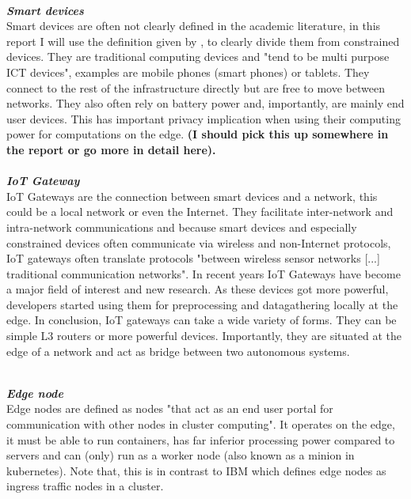 \vspace{0.5mm}\\
\textbf{\textit{Smart devices}}\\
Smart devices are often not clearly defined in the academic literature, in this report I will use the definition given by \citeauthor{poslad2011smartDevices}\cite{poslad2011smartDevices}, to clearly divide them from constrained devices. They are traditional computing devices and "tend to be multi purpose ICT devices"\cite{poslad2011smartDevices}, examples are mobile phones (smart phones) or tablets. They connect to the rest of the infrastructure directly but are free to move between networks. They also often rely on battery power and, importantly, are mainly end user devices. This has important privacy implication when using their computing power for computations on the edge. \textbf{(I should pick this up somewhere in the report or go more in detail here).}\\

\vspace{0.5mm}\\
\textbf{\textit{IoT Gateway}}\\
IoT Gateways are the connection between smart devices and a network, this could be a local network or even the Internet. They facilitate inter-network and intra-network communications and because smart devices and especially constrained devices often communicate via wireless and non-Internet protocols, IoT gateways often translate protocols "between wireless sensor networks [...] traditional communication networks"\cite{zhu2010iotGatewayDefinition}.
In recent years IoT Gateways have become a major field of interest and new research. As these devices got more powerful, developers started using them for preprocessing and datagathering locally at the edge.
In conclusion, IoT gateways can take a wide variety of forms. They can be simple L3 routers or more powerful devices. Importantly, they are situated at the edge of a network and act as bridge between two autonomous systems.


\vspace{0.5mm}\\
\textbf\textit{Edge node}\\
Edge nodes are defined as nodes "that act as an end user portal for communication with other
nodes in cluster computing"\cite{Whatised17:edgeNodeDef}.
It operates on the edge, it must be able to run containers, has far inferior processing power compared to servers and can (only) run as a worker node (also known as a minion in kubernetes)\cite{NodesKub7:edgeNodeMinion}. Note that, this is in contrast to IBM which defines edge nodes as ingress traffic nodes in a cluster\cite{IBMCloudEdgeNodes0:online}.

